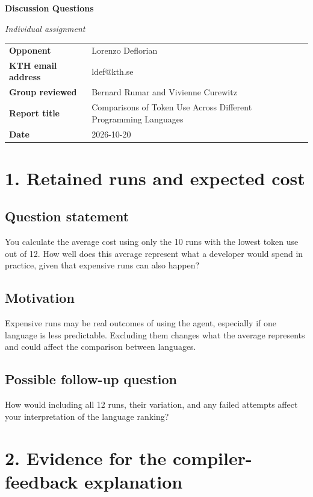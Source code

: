 \documentclass[11pt,a4paper]{extarticle}
\newcommand{\response}[1]{%
  {\color{responsegray}\fontsize{10.5}{11.8}\selectfont #1\par}\vspace{5pt}%
}
\begin{document}
{\bfseries\fontsize{14}{16}\selectfont Discussion Questions\par}
{\itshape\fontsize{11}{13}\selectfont Individual assignment\par}
\vspace{6pt}

\begin{tabularx}{\textwidth}{>{\bfseries}L{1.25in}Y}
Opponent & Lorenzo Deflorian \\
KTH email address & ldef@kth.se \\
Group reviewed & Bernard Rumar and Vivienne Curewitz \\
Report title & Comparisons of Token Use Across Different Programming Languages \\
Date & 2026-10-20 \\
\end{tabularx}
\vspace{8pt}

\section*{1. Retained runs and expected cost}

\subsection*{Question statement}
\response{You calculate the average cost using only the 10 runs with the lowest token use out of 12. How well does this average represent what a developer would spend in practice, given that expensive runs can also happen?}

\subsection*{Motivation}
\response{Expensive runs may be real outcomes of using the agent, especially if one language is less predictable. Excluding them changes what the average represents and could affect the comparison between languages.}

\subsection*{Possible follow-up question}
\response{How would including all 12 runs, their variation, and any failed attempts affect your interpretation of the language ranking?}

\section*{2. Evidence for the compiler-feedback explanation}
\end{document}
